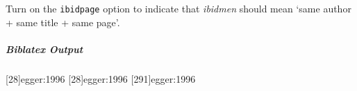 \documentclass{article}
\newenvironment{biboutput}{%
  \subparagraph{Biblatex Output}
}{\color{black}}
\begin{document}
Turn on the \texttt{ibidpage} option to indicate that \emph{ibidmen} should
mean ‘same author + same title + same page’.

\makeatletter
\let\blx@imc@ifloccit\blx@ifloccit@global
\let\blx@loccittracker\blx@loccittracker@global
\let\blx@loccitreset\blx@loccitreset@global
\makeatother

\begin{biboutput}
  [28]{egger:1996}
  [28]{egger:1996}
  [291]{egger:1996}
\end{biboutput}

\printbibliography

\printindex
\end{document}
